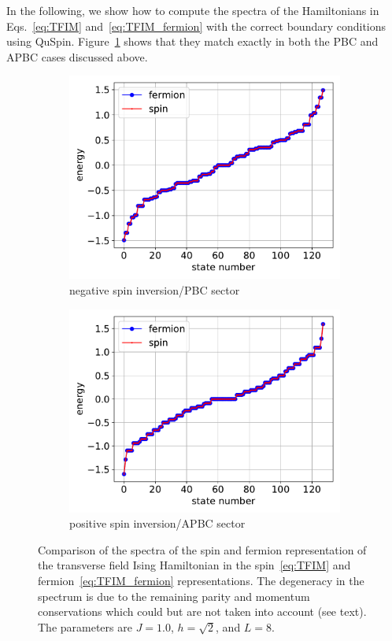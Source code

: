 \documentclass{SciPost}
\newcommand\0{\scalebox{-1}[1]{0}}
\begin{document}
In the following, we show how to compute the spectra of the Hamiltonians in Eqs.~\eqref{eq:TFIM} and~\eqref{eq:TFIM_fermion} with the correct boundary conditions using QuSpin. Figure~\ref{fig:JW} shows that they match exactly in both the PBC and APBC cases discussed above.

\begin{figure}[t!]
	\centering
	\begin{subfigure}[a]{0.496\textwidth}
		\includegraphics[width=\textwidth]{JW_PBC.pdf}
		\caption{negative spin inversion/PBC sector}
	\end{subfigure}
	\begin{subfigure}[b]{0.496\textwidth}
		\includegraphics[width=\textwidth]{JW_APBC.pdf}
		\caption{positive spin inversion/APBC sector}
	\end{subfigure}
	\caption{\label{fig:JW} Comparison of the spectra of the spin and fermion representation of the transverse field Ising Hamiltonian in the spin~\eqref{eq:TFIM} and fermion~\eqref{eq:TFIM_fermion} representations. The degeneracy in the spectrum is due to the remaining parity and momentum conservations which could but are not taken into account (see text). The parameters are $J=1.0$, $h=\sqrt{2}$, and $L=8$.}  
\end{figure} 
\end{document}
